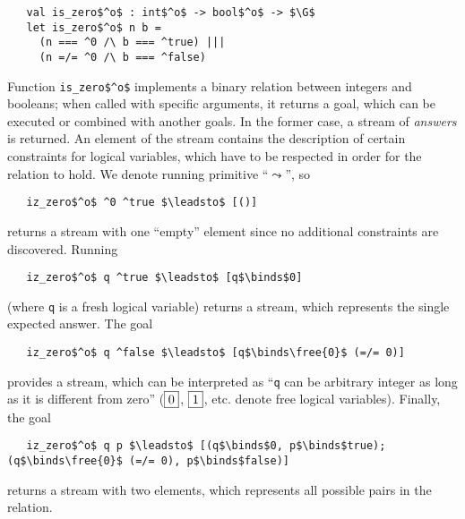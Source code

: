 \begin{lstlisting}
   val is_zero$^o$ : int$^o$ -> bool$^o$ -> $\G$
   let is_zero$^o$ n b = 
     (n === ^0 /\ b === ^true) |||
     (n =/= ^0 /\ b === ^false)
\end{lstlisting}

Function \lstinline|is_zero$^o$| implements a binary relation between integers and booleans; when called with specific arguments, it returns a goal, which can be executed or combined with another goals. In the former case, a stream of \emph{answers} is returned. An element of the stream contains the description of certain constraints for logical variables, which have to be respected in order for the relation to hold. We denote running primitive ``$\leadsto$'', so

\begin{lstlisting}
   iz_zero$^o$ ^0 ^true $\leadsto$ [()]
\end{lstlisting}

\noindent returns a stream with one ``empty'' element since no additional constraints are discovered. 
Running 

\begin{lstlisting}
   iz_zero$^o$ q ^true $\leadsto$ [q$\binds$0]
\end{lstlisting}

\noindent (where \lstinline|q| is a fresh logical variable) returns a stream, which represents the single expected answer. The goal

\begin{lstlisting}
   iz_zero$^o$ q ^false $\leadsto$ [q$\binds\free{0}$ (=/= 0)]
\end{lstlisting}

\noindent provides a stream, which can be interpreted as ``\lstinline|q| can be arbitrary integer as long as it is different from zero'' ($\boxed{0}$, $\boxed{1}$, etc. denote free logical variables). Finally, the goal

\begin{lstlisting}
   iz_zero$^o$ q p $\leadsto$ [(q$\binds$0, p$\binds$true); (q$\binds\free{0}$ (=/= 0), p$\binds$false)]
\end{lstlisting}

\noindent returns a stream with two elements, which represents all possible pairs in the relation.

